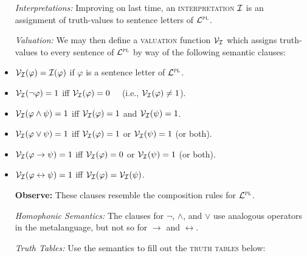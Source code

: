 \documentclass[a4paper, 11pt]{article} %
\begin{document}
\begin{itemize}[leftmargin=1.5in,labelsep=.15in]
\begin{itemize}[leftmargin=1.5in,labelsep=.15in] %
  \item[\it Interpretations:] Improving on last time, an \textsc{interpretation} $\mathcal{I}$ is an assignment of truth-values to sentence letters of $\mathcal{L}^{\textsc{pl}}$.
  \item[\it Valuation:] We may then define a \textsc{valuation} function $\mathcal{V}_{\mathcal{I}}$ which assigns truth-values to every sentence of $\mathcal{L}^{\textsc{pl}}$ by way of the following semantic clauses:
    \item $\mathcal{V}_{\mathcal{I}}(\varphi)=\mathcal{I}(\varphi)$ if $\varphi$ is a sentence letter of $\mathcal{L}^{\textsc{pl}}$.
    \item $\mathcal{V}_{\mathcal{I}}(\neg\varphi)=1$ iff $\mathcal{V}_{\mathcal{I}}(\varphi)=0$~~ (i.e., $\mathcal{V}_{\mathcal{I}}(\varphi)\neq 1$).
    \item $\mathcal{V}_{\mathcal{I}}(\varphi \wedge \psi)=1$ iff $\mathcal{V}_{\mathcal{I}}(\varphi)=1$ and $\mathcal{V}_{\mathcal{I}}(\psi)=1$.
    \item $\mathcal{V}_{\mathcal{I}}(\varphi \vee \psi)=1$ iff $\mathcal{V}_{\mathcal{I}}(\varphi)=1$ or $\mathcal{V}_{\mathcal{I}}(\psi)=1$ (or both).
    \item $\mathcal{V}_{\mathcal{I}}(\varphi \rightarrow \psi)=1$ iff $\mathcal{V}_{\mathcal{I}}(\varphi)=0$ or $\mathcal{V}_{\mathcal{I}}(\psi)=1$ (or both).
    \item $\mathcal{V}_{\mathcal{I}}(\varphi \leftrightarrow \psi)=1$ iff $\mathcal{V}_{\mathcal{I}}(\varphi)=\mathcal{V}_{\mathcal{I}}(\psi)$.
  \item[\bf Observe:] These clauses resemble the composition rules for $\mathcal{L}^{\textsc{pl}}$.
  \item[\it Homophonic Semantics:] The clauses for $\neg$, $\wedge$, and $\vee$ use analogous operators in the metalanguage, but not so for $\rightarrow$ and $\leftrightarrow$. 
  \item[\it Truth Tables:] Use the semantics to fill out the \textsc{truth tables} below:
\end{itemize}



\end{itemize}
\end{document}
